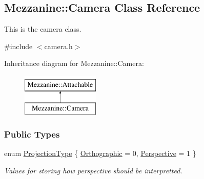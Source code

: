 \hypertarget{classMezzanine_1_1Camera}{
\subsection{Mezzanine::Camera Class Reference}
\label{classMezzanine_1_1Camera}
}


This is the camera class.  




{\ttfamily \#include $<$camera.h$>$}

Inheritance diagram for Mezzanine::Camera:\begin{figure}[H]
\begin{center}
\leavevmode
\includegraphics[height=2.000000cm]{classMezzanine_1_1Camera}
\end{center}
\end{figure}
\subsubsection*{Public Types}
\begin{DoxyCompactItemize}
\item 
enum \hyperlink{classMezzanine_1_1Camera_a643bf90630796bca5353967664d5f6e3}{ProjectionType} \{ \hyperlink{classMezzanine_1_1Camera_a643bf90630796bca5353967664d5f6e3a5bf29bb9ff44080ae6cbfa3e2aeb467c}{Orthographic} =  0, 
\hyperlink{classMezzanine_1_1Camera_a643bf90630796bca5353967664d5f6e3a616794ef1e113f63b1b9bf6896c61eba}{Perspective} =  1
 \}
\begin{DoxyCompactList}\small\item\em Values for storing how perspective should be interpretted. \item\end{DoxyCompactList}\end{DoxyCompactItemize}
